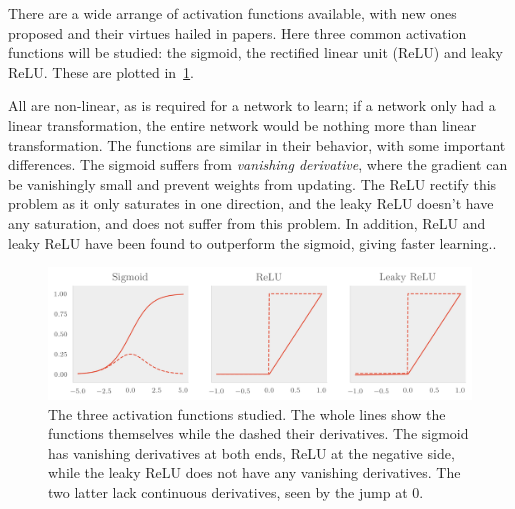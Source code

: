There are a wide arrange of activation functions available, with new ones
proposed and their virtues hailed in papers. Here three common activation
functions will be studied: the sigmoid, the rectified linear unit (ReLU) and
leaky ReLU. These are plotted in~\cref{fig:activations}.

All are non-linear, as is required for a network to learn; if a network only had
a linear transformation, the entire network would be nothing more than linear
transformation. The functions are similar in their behavior, with some important
differences. The sigmoid suffers from \textit{vanishing derivative}, where the
gradient can be vanishingly small and prevent weights from updating. The ReLU
rectify this problem as it only saturates in one direction, and the leaky ReLU
doesn't have any saturation, and does not suffer from this problem. In addition,
ReLU and leaky ReLU have been found to outperform the sigmoid, giving faster learning.\cite{mehta}\cite{statelem}.

\begin{figure}[]
  \centering
  \includegraphics[]{figures/activations.png}
  \caption{\label{fig:activations} The three activation functions studied. The
    whole lines show the functions themselves while the dashed their
    derivatives. The sigmoid has vanishing derivatives at both ends, ReLU at the
  negative side, while the leaky ReLU does not have any vanishing derivatives.
  The two latter lack continuous derivatives, seen by the jump at 0.}
\end{figure}

